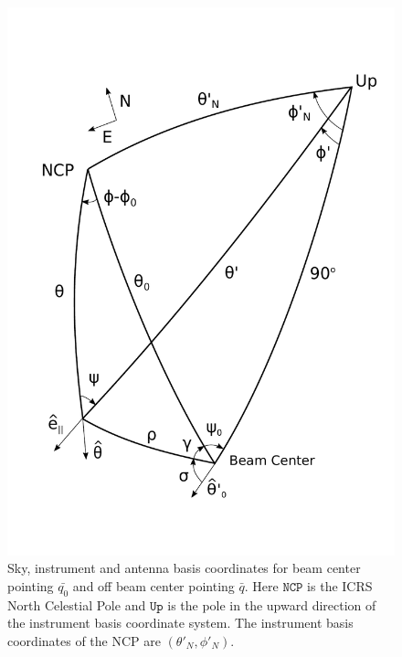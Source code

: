 \documentclass[a4paper,11pt]{article}
\begin{document}
\begin{figure}
	\centering
	\includegraphics[width=0.8\linewidth]{figures/Figure10.pdf}
	\caption{Sky, instrument and antenna basis coordinates for beam center pointing $\bar{q_0}$ and off beam center pointing $\bar{q}$. Here $\mathrm{\texttt{NCP}}$ is the ICRS North Celestial Pole and $\mathrm{\texttt{Up}}$ is the pole in the upward direction of the instrument basis coordinate system. The instrument basis coordinates of the NCP are $(\theta'_N,\phi'_N)$.}
	\label{fig::figure10}
\end{figure}
\end{document}
